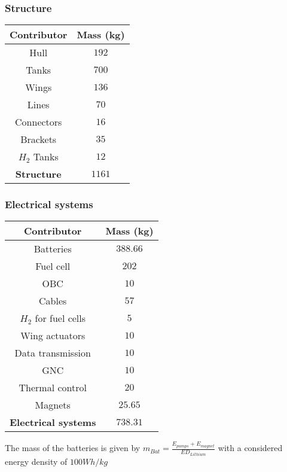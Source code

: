 \subsubsection{Structure}
\begin{center}
\begin{tabular}[H]{|c|c|}
	\hline
	\cellcolor{gray!50}Contributor & \cellcolor{gray!50}Mass (kg)\\
	\hline
	Hull & $192$\\
	\hline
	Tanks & $700$\\
	\hline
	Wings & $136$\\
	\hline
	Lines & $70$\\
	\hline
	Connectors & $16$\\
	\hline
	Brackets & $35$\\
	\hline
	$H_2$ Tanks & $12$\\
	\hline
	\cellcolor{green!30}\textbf{Structure} & \textbf{$1161$}\\
	\hline
\end{tabular}
\end{center}
\subsubsection{Electrical systems}
\begin{center}
\begin{tabular}[H]{|c|c|}
	\hline
	\cellcolor{gray!50}Contributor & \cellcolor{gray!50}Mass (kg)\\
	\hline
	Batteries & $388.66$\\
	\hline
	Fuel cell & $202$\\
	\hline
	OBC & $10$\\
	\hline
	Cables & $57$\\
	\hline
	$H_2$ for fuel cells & $5$\\
	\hline
	Wing actuators & $10$\\
	\hline
	Data transmission & $10$\\
	\hline
	GNC & $10$\\
	\hline
	Thermal control & $20$\\
	\hline
	Magnets & $25.65$\\
	\hline
	\cellcolor{green!30}\textbf{Electrical systems} & \textbf{$738.31$}\\
	\hline
\end{tabular}
\end{center}
The mass of the batteries is given by $m_{Bat} = \frac{E_{pumps} + E_{magnet}}{ED_{Lithium}}$ with a considered energy density of $100Wh/kg$

